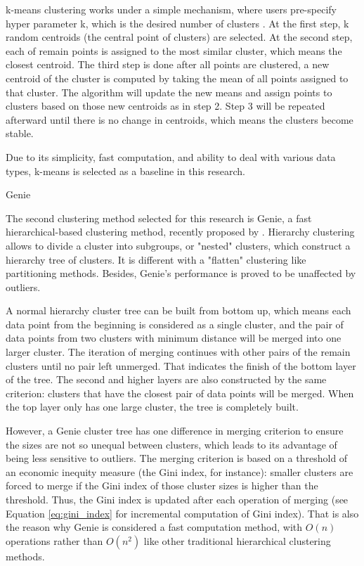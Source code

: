 \documentclass[a4paper,man,floatsintext,natbib,noextraspace]{apa6}
\makeatletter
\renewcommand{\subsubsection}{\@startsection{subsubsection}{3}
  {\z@}
  {\b@level@two@skip}
  {\e@level@two@skip}
  {\normalfont\normalsize\bfseries\itshape}}
\makeatother
\begin{document}
k-means clustering works under a simple mechanism, where users pre-specify hyper parameter k, which is the desired number of clusters \citep{hanDataMiningConcepts2012}. At the first step, k random centroids (the central point of clusters) are selected. At the second step, each of remain points is assigned to the most similar cluster, which means the closest centroid. The third step is done after all points are clustered, a new centroid of the cluster is computed by taking the mean of all points assigned to that cluster. The algorithm will update the new means and assign points to clusters based on those new centroids as in step 2. Step 3 will be repeated afterward until there is no change in centroids, which means the clusters become stable.

Due to its simplicity, fast computation, and ability to deal with various data types, k-means is selected as a baseline in this research. 

\subsubsection{Genie}

The second clustering method selected for this research is Genie, a fast hierarchical-based clustering method, recently proposed by \cite{gagolewskiGenieNewFast2016a}. Hierarchy clustering allows to divide a cluster into subgroups, or "nested" clusters, which construct a hierarchy tree of clusters. It is different with a "flatten" clustering like partitioning methods. Besides, Genie’s performance is proved to be unaffected by outliers.

A normal hierarchy cluster tree can be built from bottom up, which means each data point from the beginning is considered as a single cluster, and the pair of data points from two clusters with minimum distance will be merged into one larger cluster. The iteration of merging continues with other pairs of the remain clusters until no pair left unmerged. That indicates the finish of the bottom layer of the tree. The second and higher layers are also constructed by the same criterion: clusters that have the closest pair of data points will be merged. When the top layer only has one large cluster, the tree is completely built. 

However, a Genie cluster tree has one difference in merging criterion to ensure the sizes are not so unequal between clusters, which leads to its advantage of being less sensitive to outliers. The merging criterion is based on a threshold of an economic inequity measure (the Gini index, for instance): smaller clusters are forced to merge if the Gini index of those cluster sizes is higher than the threshold. Thus, the Gini index is updated after each operation of merging (see Equation \eqref{eq:gini_index} for incremental computation of Gini index). That is also the reason why Genie is considered a fast computation method, with $O(n)$ operations rather than $O(n^{2})$ like other traditional hierarchical clustering methods.
\end{document}
